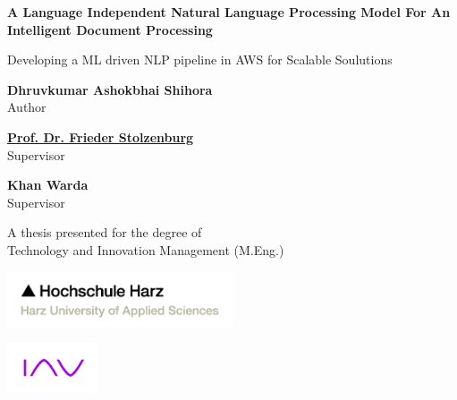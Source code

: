 \begin{titlepage}
    \begin{center}
        \vspace*{1cm}
        \huge
        \textbf{A Language Independent Natural Language Processing Model For An Intelligent Document Processing}

        \vspace{0.5cm}
        \large
        Developing a ML driven NLP pipeline in AWS for Scalable Soulutions

        \vspace{1.5cm}
        
        \normalsize\textbf{Dhruvkumar Ashokbhai Shihora}\\
        \small Author
   


        \vspace{0.5cm}
        \begin{multicols}{2}
        \href{https://www.hs-harz.de/fstolzenburg/zur-person}{\normalsize\textbf{Prof. Dr. Frieder Stolzenburg}}\\
        \small {} Supervisor


        \columnbreak
        \normalsize\textbf{Khan Warda}\\
        \small {} Supervisor

        \end{multicols}


        \vfill
        \Large A thesis presented for the degree of\\
        Technology and Innovation Management (M.Eng.)

        \vspace{0.8cm}
        \begin{multicols}{2}
        \href{https://www.hs-harz.de}{\includegraphics[width=0.5\textwidth]{chapters/LOGOS/3-HSH-Logo-RGB-en.png}}


        \columnbreak
        \href{https://www.iav.com/}{\includegraphics[width=0.2\textwidth]{chapters/LOGOS/IAV Logo Employer Branding M2 on W.jpg}}
        

\end{multicols}
\end{center}
\end{titlepage}

